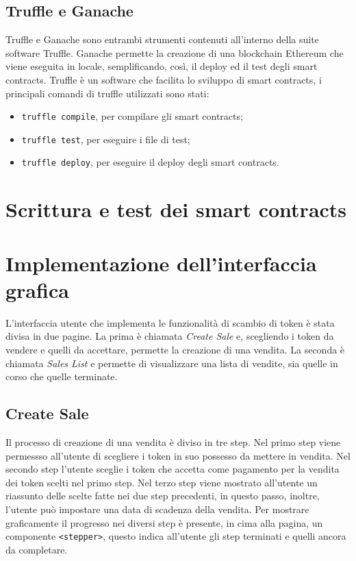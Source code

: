 \documentclass[a4paper]{article}
\begin{document}
        \subsection{Truffle e Ganache}
        Truffle e Ganache sono entrambi strumenti contenuti all'interno della suite software Truffle.
        Ganache permette la creazione di una blockchain Ethereum che viene eseguita in locale, semplificando, così,
        il deploy ed il test degli smart contracts. Truffle è un software che facilita lo sviluppo di smart contracts,
        i principali comandi di truffle utilizzati sono stati:
        \begin{itemize}
          \item \verb|truffle compile|, per compilare gli smart contracts;
          \item \verb|truffle test|, per eseguire i file di test;
          \item \verb|truffle deploy|, per eseguire il deploy degli smart contracts.
        \end{itemize}
        \newpage
        \section{Scrittura e test dei smart contracts}
        \newpage
        \section{Implementazione dell'interfaccia grafica}
        L'interfaccia utente che implementa le funzionalità di scambio di token è stata divisa in due pagine.
        La prima è chiamata \emph{Create Sale} e, scegliendo i token da vendere e quelli da accettare, permette
        la creazione di una vendita. La seconda è chiamata \emph{Sales List} e permette di visualizzare una lista di vendite, sia quelle in corso
        che quelle terminate.
        \subsection{Create Sale}
        Il processo di creazione di una vendita è diviso in tre step.
        Nel primo step viene permessso all'utente di scegliere i token in suo possesso da mettere in vendita.
        Nel secondo step l'utente sceglie i token che accetta come pagamento per la vendita dei token scelti nel primo step.
        Nel terzo step viene mostrato all'utente un riassunto delle scelte fatte nei due step precedenti, in questo passo, inoltre, l'utente può
        impostare una data di scadenza della vendita. Per mostrare graficamente il progresso nei diversi step è presente, in cima alla pagina, un componente
        \verb|<stepper>|, questo indica all'utente gli step terminati e quelli ancora da completare. 
\end{document}
